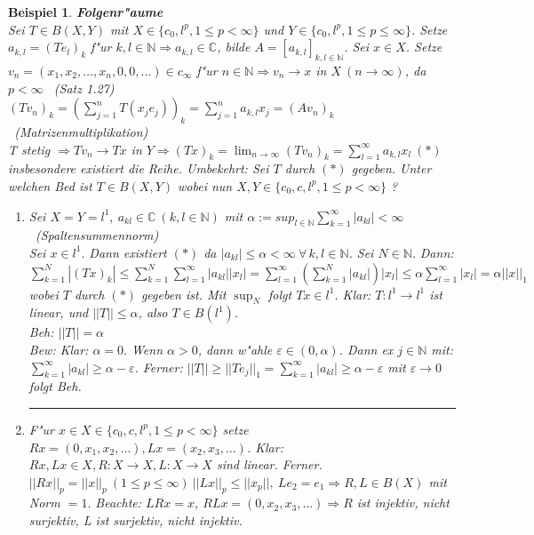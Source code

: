 \documentclass[a4paper,11pt]{book}
\newcommand{\C}{{\mathbb C}}
\newcommand{\N}{{\mathbb N}}
\newcommand{\eps}{{\varepsilon}}
\newcommand{\eb}{\begin{flushright} \rule{1ex}{1ex} \end{flushright}}
\newtheorem{Bsp}[Def]{Beispiel}
\theoremstyle{nonumberplain}
\begin{document}
\begin{Bsp}
\textbf{Folgenr"aume}\\
Sei $T \in B(X,Y)$ mit $X \in \{ c_0, l^p, 1 \leq p < \infty \}$ und $Y \in \{ c_0, l^p, 1 \leq p \leq \infty \}$. Setze $a_{k,l} = (Te_l)_k$ f"ur $k,l \in \N \Rightarrow a_{k,l} \in \C$, bilde $A = [a_{k,l}]_{k,l \in \N}$. Sei $x \in X$. Setze $v_n = (x_1,x_2,\dots,x_n,0,0,\dots) \in c_{\infty}$ f"ur $n \in \N \Rightarrow v_n \rightarrow x$ in $X \ (n \rightarrow \infty)$, da $p < \infty$ \ (Satz 1.27)\\
$(Tv_n)_k = (\sum_{j=1}^n T(x_j e_j))_k = \sum_{j=1}^n a_{k,l} x_j = (Av_n)_k$ \ (Matrizenmultiplikation)\\
T stetig $\Rightarrow Tv_n \rightarrow Tx$ in $Y \Rightarrow (Tx)_k = \lim_{n \rightarrow \infty} (Tv_n)_k = \sum_{l=1}^{\infty} a_{k,l} x_l \ (\ast)$ insbesondere existiert die Reihe. Umbekehrt: Sei $T$ durch $(\ast)$ gegeben. Unter welchen Bed ist $T \in B(X,Y)$ wobei nun $X,Y \in \{c_0,c,l^p,1 \leq p < \infty\}$ ?
\begin{enumerate}
\item[a)] Sei $X = Y = l^1,\ a_{kl} \in \C \ (k,l \in \N)$ mit $\alpha := sup_{l \in \N} \sum_{k=1}^{\infty} |a_{kl}| < \infty$ \ (Spaltensummennorm)\\
Sei $x \in l^1.$ Dann existiert $(\ast)$ da $|a_{kl}| \leq \alpha < \infty \ \forall\, k,l \in \N$. Sei $N \in \N.$ Dann: $\sum_{k=1}^N |(Tx)_k| \leq \sum_{k=1}^N \sum_{l=1}^{\infty} |a_{kl}| |x_l| = \sum_{l=1}^{\infty} (\sum_{k=1}^N |a_{kl}|)|x_l| \leq \alpha \sum_{l=1}^{\infty} |x_l| = \alpha ||x||_1$ wobei $T$ durch $(\ast)$ gegeben ist. Mit $\sup_N$ folgt $Tx \in l^1$. Klar: $T:l^1 \rightarrow l^1$ ist linear, und $||T|| \leq \alpha$, also $T \in B(l^1)$.\\
\emph{Beh:} $||T|| = \alpha$\\
\emph{Bew:} Klar: $\alpha = 0.$  Wenn $\alpha > 0$, dann w"ahle $\eps \in (0,\alpha)$. Dann ex $j \in \N$ mit: $\sum_{k=1}^{\infty} |a_{kl}| \geq \alpha - \eps$. Ferner: $||T|| \geq ||Te_j||_1 = \sum_{k=1}^{\infty} |a_{kl}| \geq \alpha - \eps$ mit $\eps \rightarrow 0$ folgt Beh. \eb
\item[b)] F"ur $x \in X \in \{ c_0,c,l^p,1\leq p < \infty\}$ setze $Rx = (0,x_1,x_2,\dots), Lx = (x_2,x_3,\dots)$. Klar: $Rx,Lx \in X, R:X \rightarrow X, L:X \rightarrow X$ sind linear. Ferner. $||Rx||_p = ||x||_p \ (1 \leq p \leq \infty) \ ||Lx||_p \leq ||x_p||,\ Le_2 = e_1 \Rightarrow R,L \in B(X)$ mit Norm $=1.$ Beachte: $LRx = x,\ RLx = (0,x_2,x_3,\dots) \Rightarrow R$ ist injektiv, nicht surjektiv, L ist surjektiv, nicht injektiv.\\

\end{enumerate}
\end{Bsp}
\end{document}
